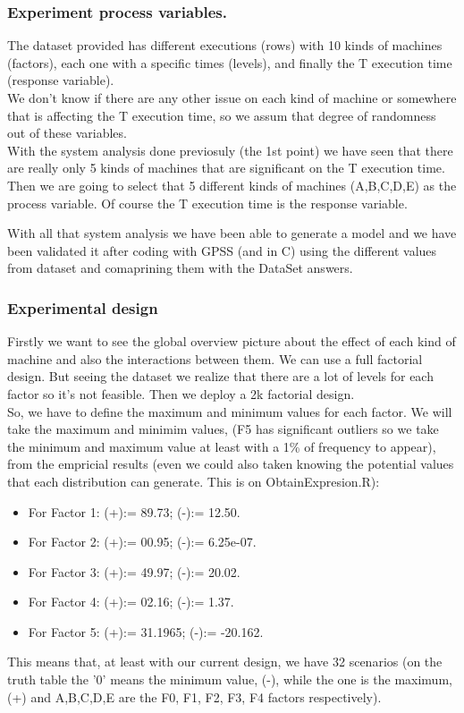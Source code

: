 \documentclass[12pt]{article}
\begin{document}
\subsubsection{Experiment process variables.}
The dataset provided has different executions (rows) with 10 kinds of machines (factors), each one with a specific times (levels), and finally the T execution time (response variable). \\
We don't know if there are any other issue on each kind of machine or somewhere that is affecting the T execution time, so we assum that degree of randomness out of these variables.\\
With the system analysis done previosuly (the 1st point) we have seen that there are really only 5 kinds of machines that are significant on the T execution time. Then we are going to select that 5 different kinds of machines (A,B,C,D,E) as the process variable. Of course the T execution time is the response variable.


With all that system analysis we have been able to generate a model and we have been validated it after coding with GPSS (and in C) using the different values from dataset and comaprining them with the DataSet answers.

\subsubsection{Experimental design}
Firstly we want to see the global overview picture about the effect of each kind of machine and also the interactions between them. We can use a full factorial design. But seeing the dataset we realize that there are a lot of levels for each factor so it's not feasible. Then we deploy a 2k factorial design.\\

So, we have to define the maximum and minimum values for each factor. We will take the maximum and minimim values, (F5 has significant outliers so we take the minimum and maximum value at least with a 1\% of frequency to appear), from the empricial results (even we could also taken knowing the potential values that each distribution can generate. This is on ObtainExpresion.R):\\
\begin{itemize}
\item For Factor 1: (+):= 89.73; (-):= 12.50.
\item For Factor 2: (+):= 00.95; (-):= 6.25e-07.
\item For Factor 3: (+):= 49.97; (-):= 20.02.
\item For Factor 4: (+):= 02.16; (-):= 1.37.
\item For Factor 5: (+):= 31.1965; (-):= -20.162.
\end{itemize}
This means that, at least with our current design, we have 32 scenarios (on the truth table the '0' means the minimum value, (-), while the one is the maximum, (+) and A,B,C,D,E are the F0, F1, F2, F3, F4 factors respectively).\\
\end{document}
